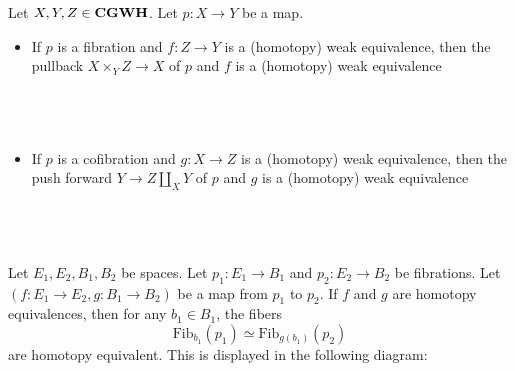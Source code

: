 \documentclass[a4paper]{article}
\begin{document}
\begin{prp}{}{} Let $X,Y,Z\in\bold{CGWH}$. Let $p:X\to Y$ be a map. 
\begin{itemize}
\item If $p$ is a fibration and $f:Z\to Y$ is a (homotopy) weak equivalence, then the pullback $X\times_YZ\to X$ of $p$ and $f$ is a (homotopy) weak equivalence \\~\\
\\~\\
\item If $p$ is a cofibration and $g:X\to Z$ is a (homotopy) weak equivalence, then the push forward $Y\to Z\coprod_XY$ of $p$ and $g$ is a (homotopy) weak equivalence \\~\\
\\~\\
\end{itemize}
\end{prp}

\begin{prp}{}{} Let $E_1,E_2,B_1,B_2$ be spaces. Let $p_1:E_1\to B_1$ and $p_2:E_2\to B_2$ be fibrations. Let $(f:E_1\to E_2,g:B_1\to B_2)$ be a map from $p_1$ to $p_2$. If $f$ and $g$ are homotopy equivalences, then for any $b_1\in B_1$, the fibers $$\text{Fib}_{b_1}(p_1)\simeq\text{Fib}_{g(b_1)}(p_2)$$ are homotopy equivalent. This is displayed in the following diagram: \\~\\
\\~\\
\end{prp}
\end{document}
